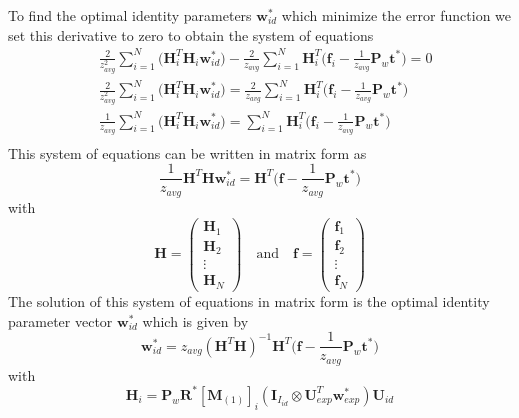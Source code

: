 \documentclass[11pt,a4paper,twoside]{report}
\begin{document}
To find the optimal identity parameters $\mathbf{w}_{id}^*$ which minimize the error function we set
this derivative to zero to obtain the system of equations 
\begin{align*}
&\frac{2}{z_{avg}^2}\sum_{i=1}^N\bigl(
\mathbf{H}_i^T\mathbf{H}_i\mathbf{w}^*_{id}\bigr)
-
\frac{2}{z_{avg}}\sum_{i=1}^N \mathbf{H}_i^T\bigl(\mathbf{f}_i -
\frac{1}{z_{avg}}\mathbf{P}_w\mathbf{t}^*\bigr) = 0\\
&\frac{2}{z_{avg}^2}\sum_{i=1}^N\bigl(
\mathbf{H}_i^T\mathbf{H}_i\mathbf{w}^*_{id}\bigr)
=
\frac{2}{z_{avg}}\sum_{i=1}^N \mathbf{H}_i^T\bigl(\mathbf{f}_i -
\frac{1}{z_{avg}}\mathbf{P}_w\mathbf{t}^*\bigr)\\
&\frac{1}{z_{avg}}\sum_{i=1}^N\bigl(
\mathbf{H}_i^T\mathbf{H}_i\mathbf{w}^*_{id}\bigr)
=
\sum_{i=1}^N \mathbf{H}_i^T\bigl(\mathbf{f}_i -
\frac{1}{z_{avg}}\mathbf{P}_w\mathbf{t}^*\bigr)\\
\end{align*}
This system of equations can be written in matrix form as
\begin{equation}
\frac{1}{z_{avg}}\mathbf{H}^T\mathbf{H}\mathbf{w}^*_{id} =
\mathbf{H}^T\bigl(\mathbf{f} - \frac{1}{z_{avg}}\mathbf{P}_w\mathbf{t}^*\bigr)
\end{equation}
with
\begin{equation}
\mathbf{H} = 
\begin{pmatrix}
\mathbf{H}_1\\
\mathbf{H}_2\\
\vdots\\
\mathbf{H}_N
\end{pmatrix}
\quad \mathrm{and} \quad 
\mathbf{f} = 
\begin{pmatrix}
\mathbf{f}_1\\
\mathbf{f}_2\\
\vdots\\
\mathbf{f}_N
\end{pmatrix}
\end{equation}
The solution of this system of equations in matrix form is the optimal identity parameter
vector $\mathbf{w}^*_{id}$ which is given by
\begin{equation}\label{eq:nonlin1}
\mathbf{w}^*_{id} = z_{avg}(\mathbf{H}^T\mathbf{H})^{-1}\mathbf{H}^T\bigl(\mathbf{f} - \frac{1}{z_{avg}}\mathbf{P}_w\mathbf{t}^*\bigr)
\end{equation}
with
\begin{equation}\label{eq:H}
\mathbf{H}_i = \mathbf{P}_w\mathbf{R}^*[\mathbf{M}_{(1)}]_{i}(\mathbf{I}_{I_{id}}
\otimes \mathbf{U}_{exp}^T\mathbf{w}^*_{exp})\mathbf{U}_{id}
\end{equation}
\end{document}
